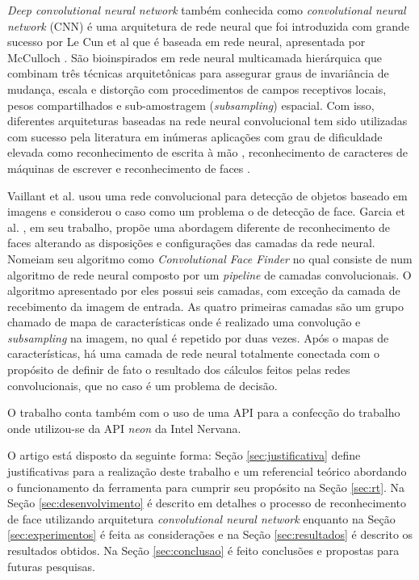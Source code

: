 \documentclass[10pt, conference]{IEEEtran}
\begin{document}
	\textit{Deep convolutional neural network} também conhecida como \textit{convolutional neural network} (CNN) é uma arquitetura de rede neural que foi introduzida com grande sucesso por Le Cun et al \cite{LeCun1989} \cite{LeCun1990H} \cite{LeCun1998G} que é baseada em rede neural, apresentada por McCulloch \cite{McCulloch1943}. São bioinspirados em rede neural multicamada hierárquica que combinam três técnicas arquitetônicas para assegurar graus de invariância de mudança, escala e distorção com procedimentos de campos receptivos locais, pesos compartilhados e sub-amostragem (\textit{subsampling}) espacial. Com isso, diferentes arquiteturas baseadas na rede neural convolucional tem sido utilizadas com sucesso pela literatura em inúmeras aplicações com grau de dificuldade elevada como reconhecimento de escrita à mão  \cite{LeCun1990H}, reconhecimento de caracteres de máquinas de escrever \cite{Martin1991} \cite{Wang1993} e reconhecimento de faces \cite{Lawrence1997}.

	Vaillant et al. \cite{Vaillant1994} usou uma rede convolucional para detecção de objetos baseado em imagens e considerou o caso como um problema o de detecção de face. Garcia et al. \cite{Garcia2004}, em seu trabalho, propõe uma abordagem diferente de reconhecimento de faces alterando as disposições e configurações das camadas da rede neural. Nomeiam seu algoritmo como \textit{Convolutional Face Finder} no qual consiste de num algoritmo de rede neural composto por um \textit{pipeline} de camadas convolucionais. O algoritmo apresentado por eles possui seis camadas, com exceção da camada de recebimento da imagem de entrada. As quatro primeiras camadas são um grupo chamado de mapa de características onde é realizado uma convolução e \textit{subsampling} na imagem, no qual é repetido por duas vezes. Após o mapas de características, há uma camada de rede neural totalmente conectada com o propósito de definir de fato o resultado dos cálculos feitos pelas redes convolucionais, que no caso é um problema de decisão.

	O trabalho conta também com o uso de uma API para a confecção do trabalho onde utilizou-se da API \textit{neon} da Intel Nervana.

	O artigo está disposto da seguinte forma: Seção \ref{sec:justificativa} define justificativas para a realização deste trabalho e um referencial teórico abordando o funcionamento da ferramenta para cumprir seu propósito na Seção \ref{sec:rt}. Na Seção \ref{sec:desenvolvimento} é descrito em detalhes o processo de reconhecimento de face utilizando arquitetura \textit{convolutional neural network} enquanto na Seção \ref{sec:experimentos} é feita as considerações e na Seção \ref{sec:resultados} é descrito os resultados obtidos. Na Seção \ref{sec:conclusao} é feito conclusões e propostas para futuras pesquisas.
\end{document}
